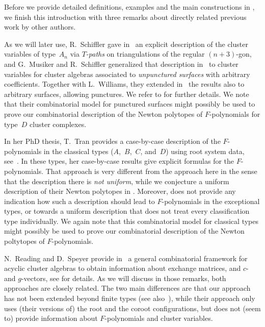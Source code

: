 \documentclass[ALCO,Unicode,ThmDefs]{cedram}
\begin{document}
\medskip

Before we provide detailed definitions, examples and the main constructions in , we finish this introduction with three remarks about directly related previous work by other authors.

\begin{rema}
As we will later use, R.~Schiffler gave in~\cite{S2008} an explicit description of the cluster variables of type~$A_n$ via \emph{$T$-paths} on triangulations of the regular $(n+3)$-gon, and G.~Musiker and R.~Schiffler generalized that description in~\cite{MS2010} to cluster variables for cluster algebras associated to \emph{unpunctured surfaces} with arbitrary coefficients. Together with L.~Williams, they extended in~\cite{MSW2011} the results also to arbitrary surfaces, allowing punctures. We refer to  for further details. We note that their combinatorial model for punctured surfaces might possibly be used to prove our combinatorial description of the Newton polytopes of $F$-polynomials for type~$D$ cluster complexes.
\end{rema}

\begin{rema}
In her PhD thesis, T.~Tran provides a case-by-case description of the $F$-polynomials in the classical types ($A$,~$B$,~$C$, and~$D$) using root system data, see~\cite[Theorem~4.16]{Tra2010}. In these types, her case-by-case results give explicit formulas for the $F$-polynomials. That approach is very different from the approach here in the sense that the description there is \emph{not uniform}, while we conjecture a uniform description of their Newton polytopes in . Moreover, \cite[Theorem~4.16]{Tra2010} does not provide any indication how such a description should lead to $F$-polynomials in the exceptional types, or towards a uniform description that does not treat every classification type individually. We again note that this combinatorial model for classical types might possibly be used to prove our combinatorial description of the Newton poltytopes of $F$-polynomials.
\end{rema}

\begin{rema}
N.~Reading and D.~Speyer provide in~\cite{RS2016} a general combinatorial framework for acyclic cluster algebras to obtain information about exchange matrices, and $c$- and $g$-vectors, see  for details. As we will discuss in those remarks, both approaches are closely related. The two main differences are that our approach has not been extended beyond finite types (see also~\cite{RS2015}), while their approach only uses (their versions of) the root and the coroot configurations, but does not (seem to) provide information about $F$-polynomials and cluster variables.
\end{rema}
\end{document}
